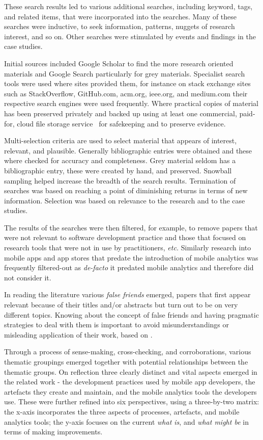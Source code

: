 These search results led to various additional searches, including keyword, tags, and related items, that were incorporated into the searches. Many of these searches were inductive, to seek information, patterns, nuggets of research interest, and so on. Other searches were stimulated by events and findings in the case studies.

Initial sources included Google Scholar to find the more research oriented materials and Google Search particularly for grey materials. Specialist search tools were used where sites provided them, for instance on stack exchange sites such as StackOverflow, GitHub.com, acm.org, ieee.org, and medium.com their respective search engines were used frequently. Where practical copies of material has been preserved privately and backed up using at least one commercial, paid-for, cloud file storage service~ for safekeeping and to preserve evidence.

Multi-selection criteria are used to select material that appears of interest, relevant, and plausible. Generally bibliographic entries were obtained and these where checked for accuracy and completeness. Grey material seldom has a bibliographic entry, these were created by hand, and preserved. Snowball sampling helped increase the breadth of the search results. Termination of searches was based on reaching a point of diminishing returns in terms of new information. Selection was based on relevance to the research and to the case studies.

The results of the searches were then filtered, for example, to remove papers that were not relevant to software development practice and those that focused on research tools that were not in use by practitioners, \emph{etc.} Similarly research into mobile apps and app stores that predate the introduction of mobile analytics was frequently filtered-out as \emph{de-facto} it predated mobile analytics and therefore did not consider it.

In reading the literature various \textit{false friends} emerged, papers that first appear relevant because of their titles and/or abstracts but turn out to be on very different topics. 
Knowing about the concept of false friends and having pragmatic strategies to deal with them is important to avoid misunderstandings or misleading application of their work, 
based on . 

Through a process of sense-making, cross-checking, and corroborations, various thematic groupings emerged together with potential relationships between the thematic groups. On reflection three clearly distinct and vital aspects emerged in the related work - the development practices used by mobile app developers, the artefacts they create and maintain, and the mobile analytics tools the developers use. These were further refined into six perspectives, using a three-by-two matrix: the x-axis incorporates the three aspects of processes, artefacts, and mobile analytics tools; the y-axis focuses on the current \emph{what is}, and \emph{what might be} in terms of making improvements. 

